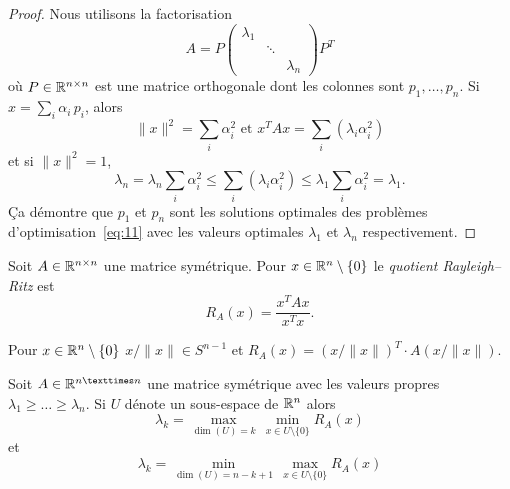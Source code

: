 \begin{proof}
  Nous utilisons la factorisation 
  \begin{displaymath}
    A = P
    \begin{pmatrix}
      \lambda_1 \\
      & \ddots \\
      && \lambda_n
    \end{pmatrix} P^T
  \end{displaymath}
où $P \in \mathbb{R}^{n\times n}$ est une matrice orthogonale dont les colonnes sont $p_1,\dots,p_n$. Si $x = \sum_i \alpha_i \,p_i$,   alors 
\begin{displaymath}
\|x\|^2 = \sum_i \alpha_i^2   \text{ et } x^T A x =  \sum_i (\lambda_i \alpha_i^2)
\end{displaymath}
et si $\|x\|^2 = 1$, 
\begin{displaymath}
\lambda_n =  \lambda_n  \sum_i  \alpha_i^2  \leq  \sum_i (\lambda_i \alpha_i^2) \leq \lambda_1  \sum_i  \alpha_i^2 = \lambda_1. 
\end{displaymath}
Ça démontre que $p_1$ et $p_n$ sont les solutions optimales des problèmes d'optimisation~\eqref{eq:11} avec les valeurs optimales $λ_1$ et $λ_n$ respectivement. 

\end{proof}



\begin{definition}
  \label{def:23}
  Soit $A \in \mathbb{R}^{n \times n}$ une matrice symétrique. Pour $x \in \mathbb{R}^n\setminus \{0\}$ le  \emph{quotient Rayleigh–Ritz } est 
\begin{displaymath}
  R_A(x) = \frac{x^TAx}{x^Tx}. 
\end{displaymath}
\end{definition}
Pour $x \in \mathbb{R}^n \setminus \{0\}$ $ x / \|x\| \in S^{n-1}$ et $R_A(x) = (x / \|x\| )^T \cdot A  (x / \|x\|)$. 

\begin{theorem}
\label{thr:19}
Soit $A \in \R^{n × n}$ une matrice symétrique avec les valeurs propres 
$\lambda_1 \geq \dots \geq \lambda_n$.   Si $U$ dénote un sous-espace de $\mathbb{R}^n$ alors 
\begin{equation}
  \label{eq:12} 
  \lambda_k = \max_{ \dim(U) = k } \, \min_{x \in U \setminus \{0\}}  R_A(x)  
\end{equation}
et
\begin{equation}
  \label{eq:13}
  \lambda_k = \min_{ \dim(U) = n-k+1 } \, \max_{x \in U \setminus \{0\}}  R_A(x)  
\end{equation}
\end{theorem}

